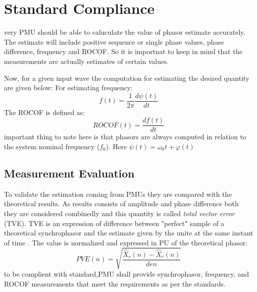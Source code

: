 \section{Standard Compliance}
very PMU should be able to caluculate the value of phasor estimate accurately. The estimate will include positive sequence or single phase values, phase difference, freqnency and ROCOF. So it is importnat to keep in mind that the measurements are actually estimates of certain values.

Now, for a given input wave the computation for estimating the desired quantity are given below:
For estimating frequency:
\begin{equation}
f(t) = \frac{1}{2\pi} \dfrac{d\psi(t)}{dt}
\end{equation}
The ROCOF is defined as:
\begin{equation}
ROCOF(t) = \dfrac{df(t)}{dt}
\end{equation}
important thing to note here is that phasors are always computed in relation to the system nominal frequency ($f_0$). Here $\psi(t) = \omega_0 t + \varphi(t)$

\subsection{Measurement Evaluation}
To validate the estimation coming from PMUs they are compared with the theoretical results. As results consists of amplitude and phase difference both they are considered combinedly and this quantity is called \textit{total vector error} (TVE). TVE is an expression of difference between "perfect" sample of a theoretical synchrophasor and the estimate given by the unite at the same instant of time \cite{std:c37}. The value is normalized and expressed in PU of the theoretical phasor:
\begin{equation}
PVE(n) = \sqrt{\frac{\hat{X}_r(n) - \hat{X}_r(n)} {den}}
\end{equation}
to be complient with standard,PMU shall provide synchrophasor, frequency, and ROCOF measurements that meet the requirements as per the standards.


